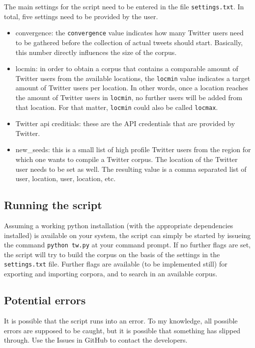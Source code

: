 \documentclass[a4paper,11pt]{article}
\begin{document}
The main settings for the script need to be entered in the file \texttt{settings.txt}. In total, five settings need to be provided by the user.

\begin{itemize}
  \item convergence: the \texttt{convergence} value indicates how many Twitter users need to be gathered before the collection of actual tweets should start. Basically, this number directly influences the size of the corpus.
  \item locmin: in order to obtain a corpus that contains a comparable amount of Twitter users from the available locations, the \texttt{locmin} value indicates a target amount of Twitter users per location. In other words, once a location reaches the amount of Twitter users in \texttt{locmin}, no further users will be added from that location. For that matter, \texttt{locmin} could also be called \texttt{locmax}.
  \item Twitter api creditials: these are the API credentials that are provided by Twitter.
  \item new\_seeds: this is a small list of high profile Twitter users from the region for which one wants to compile a Twitter corpus. The location of the Twitter user needs to be set as well. The resulting value is a comma separated list of user, location, user, location, etc.
\end{itemize}

\subsection{Running the script}

Assuming a working python installation (with the appropriate dependencies installed) is available on your system, the script can simply be started by issueing the command \texttt{python tw.py} at your command prompt. If no further flags are set, the script will try to build the corpus on the basis of the settings in the \texttt{settings.txt} file. Further flags are available (to be implemented still) for exporting and importing corpora, and to search in an available corpus.

\subsection{Potential errors}

It is possible that the script runs into an error. To my knowledge, all possible errors are supposed to be caught, but it is possible that something has slipped through. Use the Issues in GitHub to contact the developers.
\end{document}
